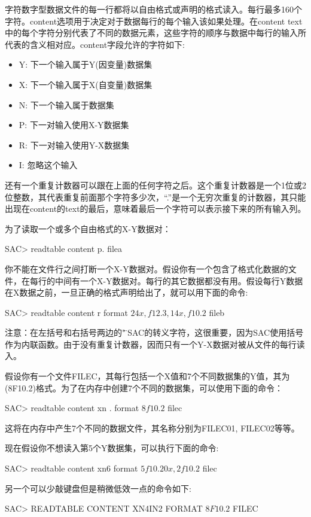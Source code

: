 字符数字型数据文件的每一行都将以自由格式或声明的格式读入。每行最多160个字符。content选项用于决定对于数据每行的每个输入该如果处理。在content text中的每个字符分别代表了不同的数据元素，这些字符的顺序与数据中每行的输入所代表的含义相对应。content字段允许的字符如下:
\begin{itemize}
\item Y: 下一个输入属于Y(因变量)数据集
\item X: 下一个输入属于X(自变量)数据集
\item N: 下一个输入属于数据集
\item P: 下一对输入使用X-Y数据集
\item R: 下一对输入使用Y-X数据集
\item I: 忽略这个输入
\end{itemize}

还有一个重复计数器可以跟在上面的任何字符之后。这个重复计数器是一个1位或2位整数，其代表重复前面那个字符多少次，``.''是一个无穷次重复的计数器，其只能出现在content的text的最后，意味着最后一个字符可以表示接下来的所有输入列。

为了读取一个或多个自由格式的X-Y数据对：
\begin{SACCode}
SAC> readtable content p. filea
\end{SACCode}

你不能在文件行之间打断一个X-Y数据对。假设你有一个包含了格式化数据的文件，在每行的中间有一个X-Y数据对。每行的其它数据都没有用。假设每行Y数据在X数据之前，一旦正确的格式声明给出了，就可以用下面的命令:
\begin{SACCode}
SAC> readtable content r format \(24x,f12.3,14x,f10.2\) fileb
\end{SACCode}
注意：在左括号和右括号两边的"\"是SAC的转义字符，这很重要，因为SAC使用括号作为内联函数。由于没有重复计数器，因而只有一个Y-X数据对被从文件的每行读入。

假设你有一个文件FILEC，其每行包括一个X值和7个不同数据集的Y值，其为(8F10.2)格式。为了在内存中创建7个不同的数据集，可以使用下面的命令：
\begin{SACCode}
SAC> readtable content xn . format \(8f10.2\) filec
\end{SACCode}
这将在内存中产生7个不同的数据文件，其名称分别为FILEC01, FILEC02等等。

现在假设你不想读入第5个Y数据集，可以执行下面的命令:
\begin{SACCode}
SAC> readtable content xn6 format \(5f10.20x,2f10.2\) filec
\end{SACCode}
另一个可以少敲键盘但是稍微低效一点的命令如下:
\begin{SACCode}
SAC> READTABLE CONTENT XN4IN2 FORMAT \(8F10.2\) FILEC
\end{SACCode}

